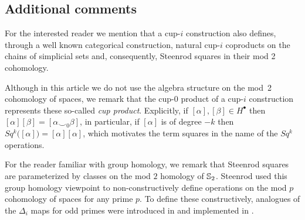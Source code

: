\subsection{Additional comments}

\begin{remark}
	For the interested reader we mention that a cup-$i$ construction also defines, through a well known categorical construction, natural cup-$i$ coproducts on the chains of simplicial sets \cite{friedman2012simplicial} and, consequently, Steenrod squares in their mod 2 cohomology.
\end{remark}

\begin{remark} \label{r:cup product}
	Although in this article we do not use the algebra structure on the mod~2 cohomology of spaces, we remark that the cup-$0$ product of a cup-$i$ construction represents these so-called \textit{cup product}.
	Explicitly, if $[\alpha], [\beta] \in H^\bullet$ then $[\alpha][\beta] = [\alpha \smallsmile_0 \beta]$, in particular, if $[\alpha]$ is of degree $-k$ then $Sq^k\big([\alpha]\big) = [\alpha] [\alpha]$, which motivates the term squares in the name of the $Sq^k$ operations.
\end{remark}

\begin{remark}
	For the reader familiar with group homology, we remark that Steenrod squares are parameterized by classes on the mod $2$ homology of $\mathbb{S}_2$.
	Steenrod used this group homology viewpoint to non-constructively define operations on the mod $p$ cohomology of spaces \cite{steenrod1962cohomology} for any prime $p$.
	To define these constructively, analogues of the $\Delta_i$ maps for odd primes were introduced in \cite{medina2021maysteenrod} and implemented in \cite{medina2021computer}.
\end{remark}